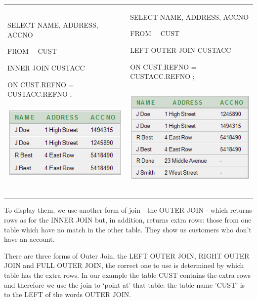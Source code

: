 \begin{flushleft}
\tablefirsthead{}
\tablehead{}
\tabletail{}
\tablelasttail{}
\begin{supertabular}{m{7.99cm}|m{7.988cm}}
SELECT  NAME, ADDRESS, ACCNO

FROM \ \ CUST

INNER JOIN  CUSTACC

ON  CUST.REFNO  = CUSTACC.REFNO ;



\begin{center}
  
\includegraphics[width=6.685cm,height=3.916cm]{images/img (46).png}

\end{center}
 &
SELECT  NAME, ADDRESS, ACCNO

FROM \ \  CUST

LEFT OUTER JOIN  CUSTACC

ON  CUST.REFNO  = CUSTACC.REFNO ;

   
\includegraphics[width=7.392cm,height=5.308cm]{images/img (47).png}
 \\
\end{supertabular}
\end{flushleft}
To display them, we use another form of join - the OUTER JOIN - which returns rows as for the INNER JOIN but, in addition, returns extra rows: those from one table which have no match in the other table. They show us customers who don't have an account.

There are three forms of Outer Join, the LEFT OUTER JOIN, RIGHT OUTER JOIN and FULL OUTER JOIN, the correct one to use is determined by which table has the extra rows. In our example the table CUST contains the extra rows and therefore we use the join to `point at' that table: the table name 'CUST' is to the LEFT of the words OUTER JOIN.

